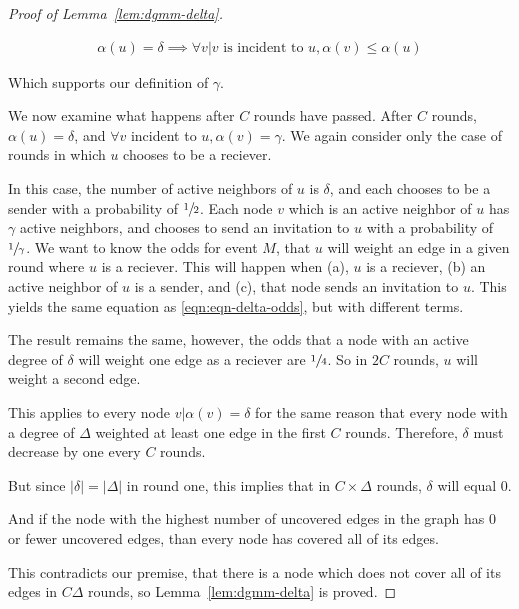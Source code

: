\begin{proof}[Proof of Lemma~\ref{lem:dgmm-delta}]
\begin{cor}
\label{cor:delta-gamma-alpha}
\begin{align*}
\alpha(u) = \delta \implies \forall v | v \text{ is incident to } u, \alpha(v) \le \alpha(u)
\end{align*}
\end{cor}

Which supports our definition of $\gamma$. 

We now examine what happens after $C$ rounds have passed. After $C$ rounds, $\alpha(u) = \delta$, and $\forall v $ incident to $u, \alpha(v) = \gamma$. We again consider only the case of rounds in which $u$ chooses to be a reciever.

In this case, the number of active neighbors of $u$ is $\delta$, and each chooses to be a sender with a probability of $\sfrac{1}{2}$. Each node $v$ which is an active neighbor of $u$ has $\gamma$ active neighbors, and chooses to send an invitation to $u$ with a probability of $\sfrac{1}{\gamma}$. We want to know the odds for event $M$, that $u$ will weight an edge in a given round where $u$ is a reciever. This will happen when (a), $u$ is a reciever, (b) an active neighbor of $u$ is a sender, and (c), that node sends an invitation to $u$. This yields the same equation as \eqref{eqn:eqn-delta-odds}, but with different terms.



The result remains the same, however, the odds that a node with an active degree of $\delta$ will weight one edge as a reciever are $\sfrac{1}{4}$. So in $2C$ rounds, $u$ will weight a second edge.

This applies to every node $v | \alpha(v) = \delta$ for the same reason that every node with a degree of $\Delta$ weighted at least one edge in the first $C$ rounds. Therefore, $\delta$ must decrease by one every $C$ rounds.

But since $|\delta| = |\Delta|$ in round one, this implies that in $C \times \Delta$ rounds, $\delta$ will equal 0. 

And if the node with the highest number of uncovered edges in the graph has 0 or fewer uncovered edges, than every node has covered all of its edges.

This contradicts our premise, that there is a node which does not cover all of its edges in $C\Delta$ rounds, so Lemma~\ref{lem:dgmm-delta} is proved.
\end{proof} 
